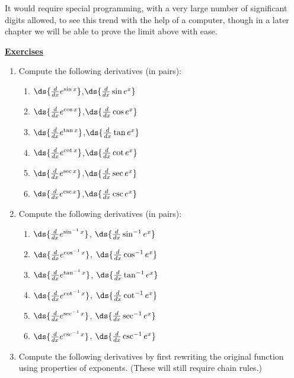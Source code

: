 It would require special programming, with a very large
number of significant digits allowed, to see this trend
with the help of a computer, though in a later chapter
we will be able to prove the limit above with ease.
\newpage
\begin{center}\underline{\Large{\bf Exercises}}\end{center}
\bigskip
\begin{multicols}{2}
\begin{enumerate}
\item Compute the following derivatives (in pairs):
\begin{enumerate}
  \item $\ds{\frac{d}{dx}e^{\sin x}}$,\qquad $\ds{\frac{d}{dx}\sin e^x}$
  \item $\ds{\frac{d}{dx}e^{\cos x}}$,\qquad $\ds{\frac{d}{dx}\cos e^x}$
  \item $\ds{\frac{d}{dx}e^{\tan x}}$,\qquad $\ds{\frac{d}{dx}\tan e^x}$
  \item $\ds{\frac{d}{dx}e^{\cot x}}$,\qquad $\ds{\frac{d}{dx}\cot e^x}$
  \item $\ds{\frac{d}{dx}e^{\sec x}}$,\qquad $\ds{\frac{d}{dx}\sec e^x}$
  \item $\ds{\frac{d}{dx}e^{\csc x}}$,\qquad $\ds{\frac{d}{dx}\csc e^x}$
\end{enumerate}
\item Compute the following derivatives (in pairs):
\begin{enumerate}
  \item $\ds{\frac{d}{dx}e^{\sin^{-1} x}}$,\qquad 
                   $\ds{\frac{d}{dx}\sin^{-1} e^x}$
  \item $\ds{\frac{d}{dx}e^{\cos^{-1} x}}$,\qquad 
                    $\ds{\frac{d}{dx}\cos^{-1} e^x}$
  \item $\ds{\frac{d}{dx}e^{\tan^{-1} x}}$,\qquad 
                    $\ds{\frac{d}{dx}\tan^{-1} e^x}$
  \item $\ds{\frac{d}{dx}e^{\cot^{-1} x}}$,\qquad 
                    $\ds{\frac{d}{dx}\cot^{-1} e^x}$
  \item $\ds{\frac{d}{dx}e^{\sec^{-1} x}}$,\qquad 
                    $\ds{\frac{d}{dx}\sec^{-1} e^x}$
  \item $\ds{\frac{d}{dx}e^{\csc^{-1}x}}$, \qquad
                    $\ds{\frac{d}{dx}\csc^{-1} e^x}$
  \end{enumerate}
\item Compute the following derivatives by first 
rewriting the original function using properties
of exponents. (These will still require chain rules.)

\end{enumerate}
\end{multicols}
